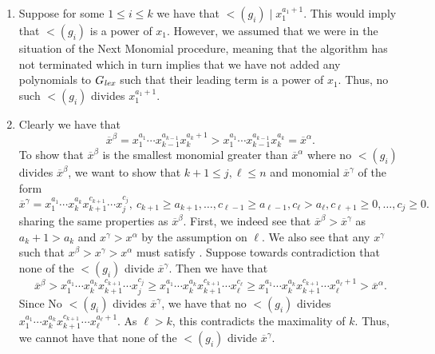 \documentclass[letterpaper, 11pt, oneside]{book}
\begin{document}
\begin{sol}\label{ex:UAG_2.3.3}
  \begin{enumerate}
    \item Suppose for some $1 \leq i \leq k$ we have that $\lt(g_{i}) \mid x_{1}^{a_{1} + 1}$.
          This would imply that $\lt(g_{i})$ is a power of $x_{1}$.
          However, we assumed that we were in the situation of the Next Monomial procedure, meaning that the algorithm has not terminated which in turn implies that we have not added any polynomials to $G_{\emph{lex}}$ such that their leading term is a power of $x_{1}$.
          Thus, no such $\lt(g_{i})$ divides $x_{1}^{a_{1} + 1}$.
    \item Clearly we have that
          \[
            \overline{x}^{\beta} = x_{1}^{a_{1}} \cdots x_{k - 1}^{a_{k - 1}} x_{k}^{a_{k} + 1} > x_{1}^{a_{1}} \cdots x_{k - 1}^{a_{k - 1}} x_{k}^{a_{k}} = \overline{x}^{\alpha}.
          \]
          To show that $\overline{x}^{\beta}$ is the smallest monomial greater than $\overline{x}^{\alpha}$ where no $\lt(g_{i})$ divides $\overline{x}^{\beta}$, we want to show that $k + 1 \leq j, \ell \leq n$ and monomial $\overline{x}^{\gamma}$ of the form
          \begin{equation}\label{eq:2.3.2(b)-conditions}
            \overline{x}^{\gamma} = x_{1}^{a_{1}} \cdots x_{k}^{a_{k}} x_{k + 1}^{c_{k + 1}} \cdots x_{j}^{c_{j}},\ c_{k + 1} \geq a_{k + 1}, \ldots, c_{\ell - 1} \geq a_{\ell - 1}, c_{\ell} > a_{\ell}, c_{\ell + 1} \geq 0, \ldots, c_{j} \geq 0.
          \end{equation}
          sharing the same properties as $\overline{x}^{\beta}$.
          First, we indeed see that $\overline{x}^{\beta} > \overline{x}^{\gamma}$ as $a_{k} + 1 > a_{k}$ and $x^{\gamma} > x^{\alpha}$ by the assumption on $\ell$.
          We also see that any $x^{\gamma}$ such that $x^{\beta} > x^{\gamma} > x^{\alpha}$ must satisfy .
          Suppose towards contradiction that none of the $\lt(g_{i})$ divide $\overline{x}^{\gamma}$.
          Then we have that
          \[
            \overline{x}^{\beta} > x_{1}^{a_{1}} \cdots x_{k}^{a_{k}} x_{k + 1}^{c_{k + 1}} \cdots x_{j}^{c_{j}} \geq x_{1}^{a_{1}} \cdots x_{k}^{a_{k}} x_{k + 1}^{c_{k + 1}} \cdots x_{\ell}^{c_{\ell}} \geq x_{1}^{a_{1}} \cdots x_{k}^{a_{k}} x_{k + 1}^{c_{k + 1}} \cdots x_{\ell}^{a_{\ell} + 1} > \overline{x}^{\alpha}.
          \]
          Since No $\lt(g_{i})$ divides $\overline{x}^{\gamma}$, we have that no $\lt(g_{i})$ divides $x_{1}^{a_{1}} \cdots x_{k}^{a_{k}} x_{k + 1}^{c_{k + 1}} \cdots x_{\ell}^{a_{\ell} + 1}$.
          As $\ell > k$, this contradicts the maximality of $k$.
          Thus, we cannot have that none of the $\lt(g_{i})$ divide $\overline{x}^{\gamma}$.
  \end{enumerate}
\end{sol}
\end{document}
